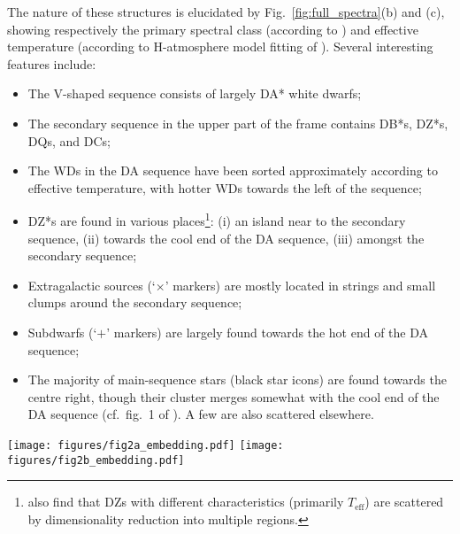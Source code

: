 \documentclass[fleqn,usenatbib]{mnras}
\def\Teff{T_\mathrm{eff}}
\begin{document}
The nature of these structures is elucidated by Fig.~\ref{fig:full_spectra}(b) and (c), showing respectively the primary spectral class (according to \citealt{manser24}) and effective temperature (according to H-atmosphere model fitting of \citealt{gentilefusillo19}).
Several interesting features include:
\begin{itemize}
\item
The V-shaped sequence consists of largely DA* white dwarfs;
\item
The secondary sequence in the upper part of the frame contains DB*s, DZ*s, DQs, and DCs;
\item
The WDs in the DA sequence have been sorted approximately according to effective temperature, with hotter WDs towards the left of the sequence;
\item
DZ*s are found in various places\footnote{
    \citet{kao24} also find that DZs with different characteristics (primarily $\Teff$) are scattered by dimensionality reduction into multiple regions.
}: (i) an island near to the secondary sequence, (ii) towards the cool end of the DA sequence, (iii) amongst the secondary sequence;
\item
Extragalactic sources (`$\times$' markers) are mostly located in strings and small clumps around the secondary sequence;
\item 
Subdwarfs (`$+$' markers) are largely found towards the hot end of the DA sequence;
\item
The majority of main-sequence stars (black star icons) are found towards the centre right, though their cluster merges somewhat with the cool end of the DA sequence (cf.\ fig.~1 of \citealt{eisenstein06}).
A few are also scattered elsewhere.
\end{itemize}

\begin{figure*}
    \centering
\texttt{[image: figures/fig2a\_embedding.pdf]}
\texttt{[image: figures/fig2b\_embedding.pdf]}
\caption{
    (a) $t$SNE embedding of DESI EDR WD candidate spectra.
    The embedding aims to reflect the pairwise distances between the high-dimensional spectra in a two-dimensional space; as such the axes are arbitrary.
    (b) The embedding is colour-coded according to the visual spectral classification of \citet{manser24}.
    For WDs, the colour corresponds to primary spectral type: DA*s (inc.\ DAZs, etc.) in red; DB*s in blue, and so on.
    Other sources not corresponding to individual WDs have different symbols (see key).
    The main feature of the embedding is the sequence of DA*s (red), though several other clusters are clear (see text).
    (c) The embedding is colour-coded by effective temperature, according to the hydrogen-atmosphere WD model which best fits the sources' Gaia photometry \citep{gentilefusillo19}.
    The DA sequence extends from hotter WDs on the left around to cooler WDs at the top right.
    Note that objects with a low probability of being a WD ($P_\mathrm{WD} < 0.75$; see \citealt{gentilefusillo15}) are not assigned a temperature \citep{gentilefusillo19}.
}
\label{fig:full_spectra}
\end{figure*}
\end{document}
